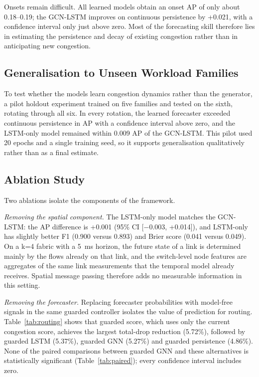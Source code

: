 \documentclass[conference]{IEEEtran}
\begin{document}
Onsets remain difficult. All learned models obtain an onset AP of only about 0.18--0.19; the GCN-LSTM improves on continuous persistence by +0.021, with a confidence interval only just above zero. Most of the forecasting skill therefore lies in estimating the persistence and decay of existing congestion rather than in anticipating new congestion.

\subsection{Generalisation to Unseen Workload Families}
To test whether the models learn congestion dynamics rather than the generator, a pilot holdout experiment trained on five families and tested on the sixth, rotating through all six. In every rotation, the learned forecaster exceeded continuous persistence in AP with a confidence interval above zero, and the LSTM-only model remained within 0.009 AP of the GCN-LSTM. This pilot used 20 epochs and a single training seed, so it supports generalisation qualitatively rather than as a final estimate.

\subsection{Ablation Study}
Two ablations isolate the components of the framework.

\emph{Removing the spatial component.} The LSTM-only model matches the GCN-LSTM: the AP difference is +0.001 (95\% CI [$-0.003$, +0.014]), and LSTM-only has slightly better F1 (0.900 versus 0.893) and Brier score (0.041 versus 0.049). On a k=4 fabric with a 5~ms horizon, the future state of a link is determined mainly by the flows already on that link, and the switch-level node features are aggregates of the same link measurements that the temporal model already receives. Spatial message passing therefore adds no measurable information in this setting.

\emph{Removing the forecaster.} Replacing forecaster probabilities with model-free signals in the same guarded controller isolates the value of prediction for routing. Table~\ref{tab:routing} shows that guarded score, which uses only the current congestion score, achieves the largest total-drop reduction (5.72\%), followed by guarded LSTM (5.37\%), guarded GNN (5.27\%) and guarded persistence (4.86\%). None of the paired comparisons between guarded GNN and these alternatives is statistically significant (Table~\ref{tab:paired}); every confidence interval includes zero.
\end{document}
